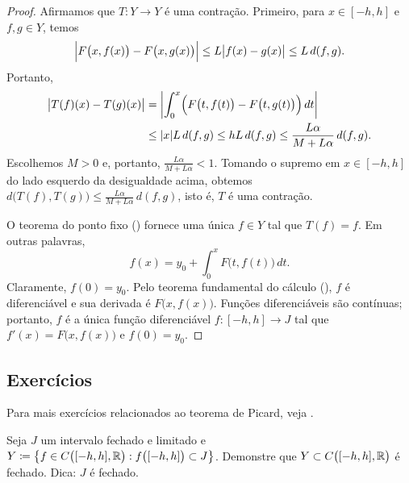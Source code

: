 \begin{proof}
Afirmamos que $T \colon Y \to Y$ é uma contração. Primeiro, para $x \in [-h,h]$
e $f,g \in Y$, temos
\begin{equation*}
\Bigl\lvert {F\bigl(x,f(x)\bigr) - F\bigl(x,g(x)\bigr)} \Bigr\rvert \leq
L\bigl\lvert {f(x)- g(x)} \bigr\rvert \leq L \, d(f,g) .
\end{equation*}
Portanto,
\begin{equation*}
\begin{split}
\bigl\lvert {T(f)(x) - T(g)(x)} \bigr\rvert
&= \left\lvert {\int_0^x \Bigl( F\bigl(t,f(t)\bigr) - F\bigl(t,g(t)\bigr)\Bigr)\,dt} \right\rvert \\
& \leq \lvert {x} \rvert L \, d(f,g)
 \leq h L\, d(f,g)
 \leq \frac{L\alpha}{M+L\alpha} \, d(f,g) .
\end{split}
\end{equation*}
Escolhemos $M > 0$ e, portanto,
$\frac{L\alpha}{M+L\alpha} < 1$.
Tomando o supremo em $x \in [-h,h]$ do lado esquerdo da desigualdade acima, obtemos
$d\bigl(T(f),T(g)\bigr) \leq \frac{L\alpha}{M+L\alpha} \, d(f,g)$,
isto é, $T$ é uma contração.

O teorema do ponto fixo ()
fornece uma única $f \in Y$ tal que $T(f) = f$.
Em outras palavras,
\begin{equation*} %
f(x) = y_0 + \int_0^x F\bigl(t,f(t)\bigr)\,dt .
\end{equation*}
Claramente, $f(0) = y_0$.
Pelo teorema fundamental do cálculo (),
$f$ é diferenciável e sua derivada é
$F\bigl(x,f(x)\bigr)$.
Funções diferenciáveis são contínuas; portanto,
$f$ é a única função diferenciável $f \colon [-h,h] \to J$
tal que
 $f'(x) = F\bigl(x,f(x)\bigr)$ e $f(0) = y_0$.
\end{proof}

\subsection{Exercícios}



\begin{exnote}
Para mais exercícios relacionados ao teorema de Picard, veja .
\end{exnote}

\begin{exercise}
Seja $J$ um intervalo fechado e limitado e
$Y \coloneqq \bigl\{ f \in C\bigl([-h,h],{\mathbb{R}}\bigr) : f\bigl([-h,h]\bigr) \subset J \bigr\}$.
Demonstre que $Y \subset C\bigl([-h,h],{\mathbb{R}}\bigr)$ é fechado. Dica: $J$ é fechado.
\end{exercise}

